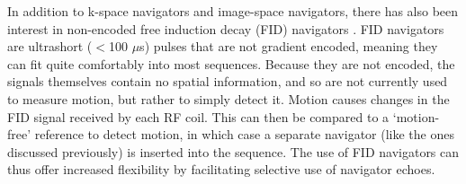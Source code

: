 \documentclass[class=article, crop=false]{standalone}
\begin{document}
\par 
In addition to k-space navigators and image-space navigators, there has also been interest in non-encoded free induction decay (FID) navigators \parencite{Waszak2016,MRM:MRM22797}. FID navigators are ultrashort ($<$100 $\mu$s) pulses that are not gradient encoded, meaning they can fit quite comfortably into most sequences. Because they are not encoded, the signals themselves contain no spatial information, and so are not currently used to measure motion, but rather to simply detect it. Motion causes changes in the FID signal received by each RF coil. This can then be compared to a `motion-free' reference to detect motion, in which case a separate navigator (like the ones discussed previously) is inserted into the sequence. The use of FID navigators can thus offer increased flexibility by facilitating selective use of navigator echoes. 
\end{document}
